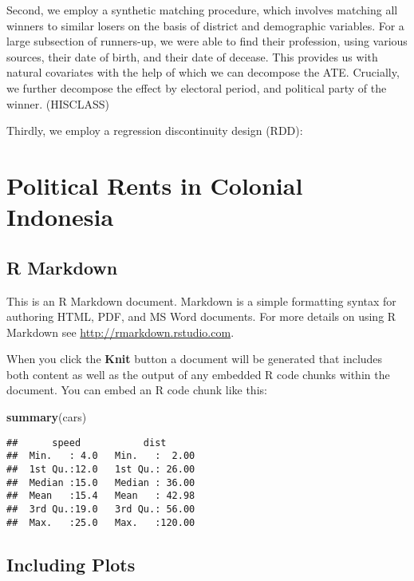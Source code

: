 \documentclass[]{book}
\newenvironment{Shaded}{\begin{snugshade}}{\end{snugshade}}
\newcommand{\KeywordTok}[1]{\textcolor[rgb]{0.13,0.29,0.53}{\textbf{#1}}}
\newcommand{\NormalTok}[1]{#1}
\begin{document}
Second, we employ a synthetic matching procedure, which involves matching all winners to similar losers on the basis of district and demographic variables. For a large subsection of runners-up, we were able to find their profession, using various sources, their date of birth, and their date of decease. This provides us with natural covariates with the help of which we can decompose the ATE. Crucially, we further decompose the effect by electoral period, and political party of the winner. (HISCLASS)

Thirdly, we employ a regression discontinuity design (RDD):

\hypertarget{prci}{%
\chapter{Political Rents in Colonial Indonesia}\label{prci}}

\hypertarget{r-markdown}{%
\section{R Markdown}\label{r-markdown}}

This is an R Markdown document. Markdown is a simple formatting syntax for authoring HTML, PDF, and MS Word documents. For more details on using R Markdown see \url{http://rmarkdown.rstudio.com}.

When you click the \textbf{Knit} button a document will be generated that includes both content as well as the output of any embedded R code chunks within the document. You can embed an R code chunk like this:

\begin{Shaded}
\begin{Highlighting}[]
\KeywordTok{summary}\NormalTok{(cars)}
\end{Highlighting}
\end{Shaded}

\begin{verbatim}
##      speed           dist       
##  Min.   : 4.0   Min.   :  2.00  
##  1st Qu.:12.0   1st Qu.: 26.00  
##  Median :15.0   Median : 36.00  
##  Mean   :15.4   Mean   : 42.98  
##  3rd Qu.:19.0   3rd Qu.: 56.00  
##  Max.   :25.0   Max.   :120.00
\end{verbatim}

\hypertarget{including-plots}{%
\section{Including Plots}\label{including-plots}}
\end{document}
